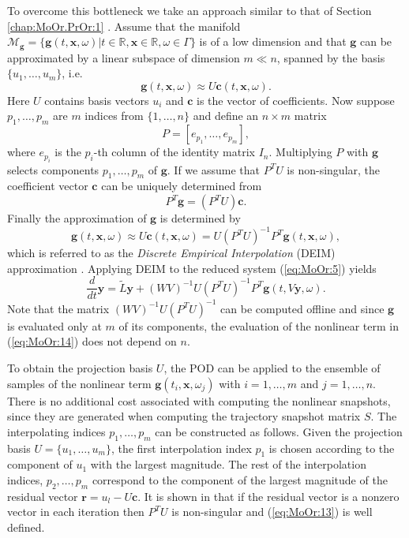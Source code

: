 {\edit To overcome this bottleneck we take an approach similar to that of Section \ref{chap:MoOr.PrOr:1} \cite{Chaturantabut:2010cz,Barrault:2004kz}}. Assume that the manifold $\mathcal M_{\mathbf g} = \{ \mathbf g(t,\mathbf x , \omega)| t\in \mathbb R, \mathbf x \in \mathbb R , \omega \in \Gamma\}$ is of a low dimension and that $\mathbf g$ can be approximated by a linear subspace of dimension $m\ll n$, spanned by the basis $\{ u_1 , \dots , u_m \}$, i.e.
\begin{equation} \label{eq:MoOr:10}
	\mathbf g(t,\mathbf x,\omega) \approx U \mathbf c(t,\mathbf x,\omega).
\end{equation}
Here $U$ contains basis vectors $u_i$ and $\mathbf c$ is the vector of coefficients. Now suppose $p_1,\dots,p_m$ are $m$ indices from $\{1,\dots,n\}$ and define an $n\times m$ matrix
\begin{equation} \label{eq:MoOr:11}
	P = [e_{p_1},\dots,e_{p_m}],
\end{equation}
where $e_{p_i}$ is the $p_i$-th column of the identity matrix $I_n$. Multiplying $P$ with $\mathbf g$ selects components $p_1,\dots,p_m$ of $\mathbf g$. If we assume that $P^TU$ is non-singular, the coefficient vector $\mathbf c$ can be uniquely determined from
\begin{equation} \label{eq:MoOr:12}
	P^T \mathbf g = (P^TU)\mathbf c.
\end{equation}
Finally the approximation of $\mathbf g$ is determined by
\begin{equation} \label{eq:MoOr:13}
	\mathbf g(t,\mathbf x,\omega) \approx U \mathbf c(t,\mathbf x,\omega) = U (P^TU)^{-1} P^T \mathbf g(t,\mathbf x,\omega),
\end{equation}
which is referred to as the \emph{Discrete Empirical Interpolation} (DEIM) approximation \cite{Chaturantabut:2010cz}. Applying DEIM to the reduced system (\ref{eq:MoOr:5}) yields
\begin{equation} \label{eq:MoOr:14}
	\frac{d}{dt} \mathbf y = \tilde L \mathbf y + (WV)^{-1} U(P^TU)^{-1}P^T \mathbf g(t,V\mathbf y , \omega).
\end{equation}
Note that the matrix $(WV)^{-1} U(P^TU)^{-1}$ can be computed offline and since $\mathbf g$ is evaluated only at $m$ of its components, the evaluation of the nonlinear term in (\ref{eq:MoOr:14}) does not depend on $n$.

{\edit To obtain the projection basis $U$, the POD can be applied to the ensemble of samples of the nonlinear term $\mathbf g(t_i,\mathbf x, \omega_j)$ with $i=1,\dots,m$ and $j=1,\dots,n$}. There is no additional cost {\edit associated with} computing the nonlinear snapshots, since they are generated when computing the trajectory snapshot matrix $S$. The interpolating indices $p_1,\dots,p_m$ can be constructed as follows. Given the projection basis $U = \{u_1,\dots,u_m\}$, the first interpolation index $p_1$ is chosen according to the component of $u_1$ with the largest magnitude. The rest of the interpolation indices, $p_2,\dots,p_m$ correspond to the component of the largest magnitude of the residual vector $\mathbf r = u_l - U \mathbf c$. It is shown in \cite{Chaturantabut:2010cz} that if the residual vector is a nonzero vector in each iteration then $P^TU$ is non-singular and (\ref{eq:MoOr:13}) is well defined. 

